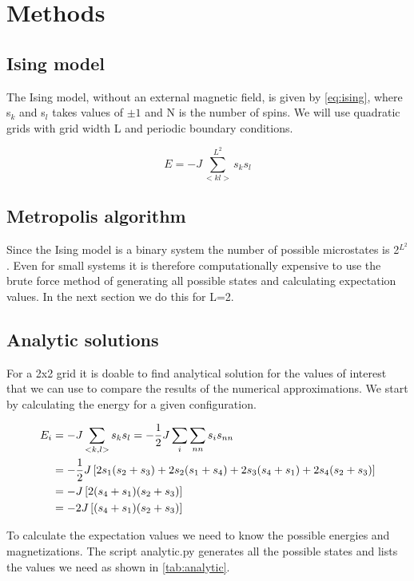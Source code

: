 \section{Methods}


\subsection{Ising model}

The Ising model, without an external magnetic field, is given by
\cref{eq:ising}, where s$_k$ and s$_l$ takes values of $\pm 1$ and N is the
number of spins. We will use quadratic grids with grid width L and periodic
boundary conditions.

\begin{equation}
  \label{eq:ising}
  E = -J\sum_{<kl>}^{L^2} s_k s_l
\end{equation}


\subsection{Metropolis algorithm}

Since the Ising model is a binary system the number of possible microstates is
2$^{L^2}$. Even for small systems it is therefore computationally expensive to use
the brute force method of generating all possible states and calculating
expectation values. In the next section we do this for L=2.

\subsection{Analytic solutions}

For a 2x2 grid it is doable to find analytical solution for the values of
interest that we can use to compare the results of the numerical approximations.
We start by calculating the energy for a given configuration.



\begin{align*}
  E_i &= -J \sum_{<k,l>} s_k s_l = -\frac{1}{2}J \sum_{i} \sum_{nn} s_i s_{nn} \\
      &= -\frac{1}{2} J \left[2 s_1 (s_2 + s_3) + 2s_2(s_1 + s_4) + 2s_3(s_4 + s_1) + 2s_4 (s_2 + s_3)\right]\\
      &= -J\left[ 2(s_4 + s_1)(s_2 + s_3)\right] \\
      &= -2J\left[(s_4 + s_1)(s_2+s_3)\right]
\end{align*}

To calculate the expectation values we need to know the possible energies and
magnetizations. The script analytic.py \parencite{github} generates all the
possible states and lists the values we need as shown in \cref{tab:analytic}.

